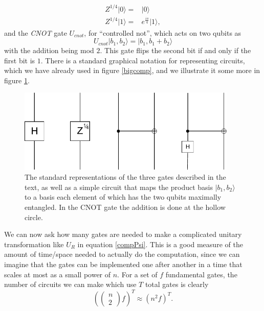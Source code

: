 \documentclass[12pt]{article}
\newcommand{\be}{\begin{equation}}
\newcommand{\ee}{\end{equation}}
\newcommand{\ran}{\rangle}
\begin{document}
\begin{align}\nonumber
Z^{1/4}|0\ran=&|0\ran\\
Z^{1/4}|1\ran=&e^{\frac{i\pi}{4}}|1\ran,
\end{align}
and the \textit{CNOT} gate $U_{cnot}$, for ``controlled not'', which acts on two qubits as
\be
U_{cnot}|b_1,b_2\ran=|b_1,b_1+b_2\ran
\ee
with the addition being mod $2$.  This gate flips the second bit if and only if the first bit is $1$.  There is a standard graphical notation for representing circuits, which we have already used in figure \ref{bigcomp}, and we illustrate it some more in figure \ref{gates}.
\begin{figure}
\begin{center}
\includegraphics[height=4cm]{gates.pdf}
\end{center}
\caption{The standard representations of the three gates described in the text, as well as a simple circuit that maps the product basis $|b_1,b_2\ran$ to a basis each element of which has the two qubits maximally entangled.  In the CNOT gate the addition is done at the hollow circle.}\label{gates}
\end{figure} 

We can now ask how many gates are needed to make a complicated unitary transformation like $U_R$ in equation \eqref{compPsi}.  This is a good measure of the amount of time/space needed to actually do the computation, since we can imagine that the gates can be implemented one after another in a time that scales at most as a small power of $n$.  For a set of $f$ fundamental gates, the number of circuits we can make which use $T$ total gates is clearly 
\be
\left(\begin{pmatrix}
n\\
2
\end{pmatrix}f\right)^{T}\approx (n^2f)^{T}.
\ee
  
\end{document}
